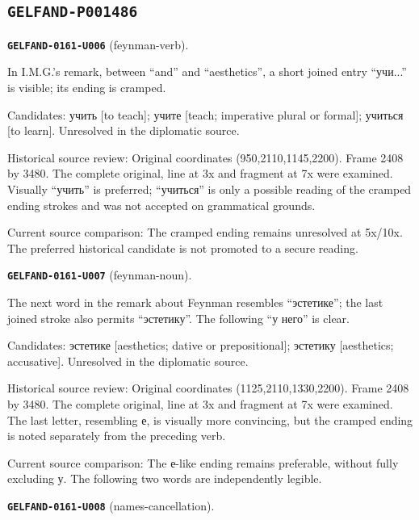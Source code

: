 \subsection*{\texttt{GELFAND-P001486}}
\par\noindent\leavevmode{}\label{GELFAND-0161-U006}\label{GELFAND-P001486:feynman-verb}\textbf{\texttt{GELFAND-0161-U006}} (feynman-verb).\nopagebreak[4]\par
In I.M.G.’s remark, between “and” and “aesthetics”, a short joined entry “учи...” is visible; its ending is cramped.\par
Candidates: учить [to teach]; учите [teach; imperative plural or formal]; учиться [to learn]. Unresolved in the diplomatic source.\par
Historical source review: Original coordinates (950,2110,1145,2200). Frame 2408 by 3480. The complete original, line at 3x and fragment at 7x were examined. Visually “учить” is preferred; “учиться” is only a possible reading of the cramped ending strokes and was not accepted on grammatical grounds.\par
Current source comparison: The cramped ending remains unresolved at 5x/10x. The preferred historical candidate is not promoted to a secure reading.\par\medskip
\par\noindent\leavevmode{}\label{GELFAND-0161-U007}\label{GELFAND-P001486:feynman-noun}\textbf{\texttt{GELFAND-0161-U007}} (feynman-noun).\nopagebreak[4]\par
The next word in the remark about Feynman resembles “эстетике”; the last joined stroke also permits “эстетику”. The following “у него” is clear.\par
Candidates: эстетике [aesthetics; dative or prepositional]; эстетику [aesthetics; accusative]. Unresolved in the diplomatic source.\par
Historical source review: Original coordinates (1125,2110,1330,2200). Frame 2408 by 3480. The complete original, line at 3x and fragment at 7x were examined. The last letter, resembling е, is visually more convincing, but the cramped ending is noted separately from the preceding verb.\par
Current source comparison: The е-like ending remains preferable, without fully excluding у. The following two words are independently legible.\par\medskip
\par\noindent\leavevmode{}\label{GELFAND-0161-U008}\label{GELFAND-P001486:names-cancellation}\textbf{\texttt{GELFAND-0161-U008}} (names-cancellation).\nopagebreak[4]\par
